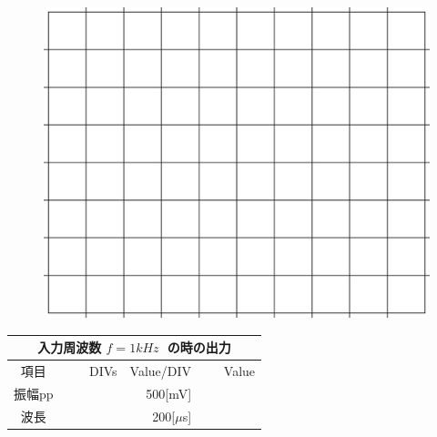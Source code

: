 \documentclass[uplatex,a4paper,11pt,oneside,openany]{jsbook}
\begin{document}
\begin{multicols}{2}
  \begin{figure}[H]
     \centering
      \includegraphics[keepaspectratio, scale=0.28, angle=0]
                  {figs/eps/grid.eps}
                  \label{fig:grid30mV}
  \end{figure}

  \begin{spacing}{1.5}
  \begin{tabular}{|c||r|r|r|}
    \multicolumn{4}{c}{入力周波数 $f=1kHz\;$ の時の出力} \\ \hline
    項目 & DIVs & Value/DIV & Value \\ \hline \hline
    振幅pp & 　　　　 & 500[mV]& 　　　　 \\ \hline
    波長 & 　　　　 & 200[$\mu$s]& 　　　　 \\ \hline
  \end{tabular}
\end{spacing}
\end{multicols}

\vfill
\end{document}

